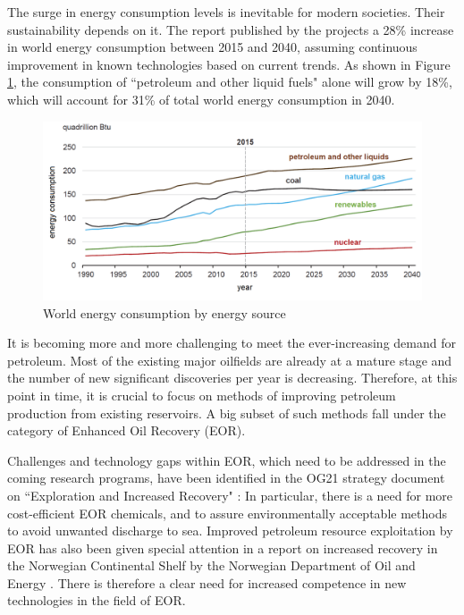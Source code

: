The surge in energy consumption levels is inevitable for modern societies. Their sustainability depends on it. The  report \citeyearpar{EIA2017} published by the  projects a 28\% increase in world energy consumption between 2015 and 2040, assuming continuous improvement in known technologies based on current trends. As shown in Figure \ref{cht:energySources}, the consumption of ``petroleum and other liquid fuels" alone will grow by 18\%, which will account for 31\% of total world energy consumption in 2040.

\begin{figure}[b!]
    \centering
    \includegraphics[width=\textwidth]{img/chart/chtEiaEnergy}
    \caption{World energy consumption by energy source \citep{EIA2017}}
    \label{cht:energySources}
\end{figure}

It is becoming more and more challenging to meet the ever-increasing demand for petroleum. Most of the existing major oilfields are already at a mature stage and the number of new significant discoveries per year is decreasing. Therefore, at this point in time, it is crucial to focus on methods of improving petroleum production from existing reservoirs. A big subset of such methods fall under the category of Enhanced Oil Recovery (EOR).

Challenges and technology gaps within EOR,  which need to be addressed in the coming research programs, have been identified in the OG21 strategy document on ``Exploration and Increased Recovery" \citep{OG21}: In particular, there is a need for more cost-efficient EOR chemicals, and to assure environmentally acceptable methods to avoid unwanted discharge to sea. Improved petroleum resource exploitation by EOR has also been given special attention in a report on increased recovery in the Norwegian Continental Shelf by the Norwegian Department of Oil and Energy \citep{Am2010}. There is therefore a clear need for increased competence in new technologies in the field of EOR. 

